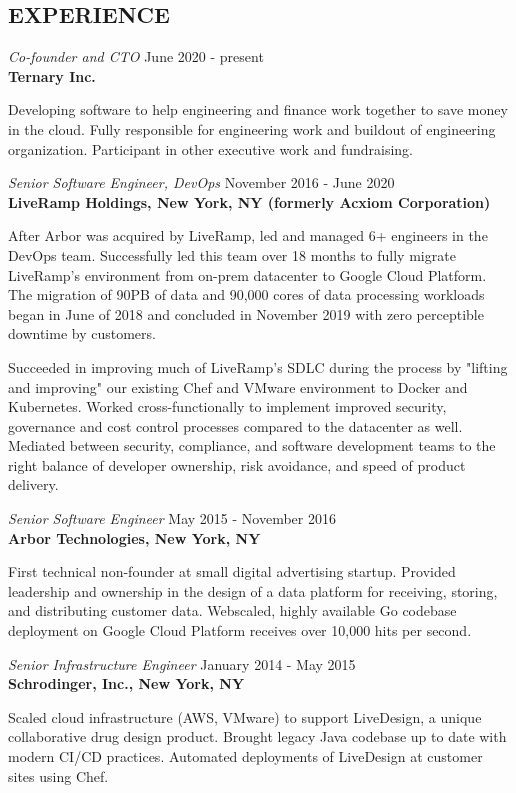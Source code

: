 \documentclass[overlapped,line,margin]{res}
\begin{document}
\begin{resume}
\section{EXPERIENCE}
\textit{Co-founder and CTO} \hfill June 2020 - present \\
\textbf{Ternary Inc.}

  Developing software to help engineering and finance work together to
  save money in the cloud. Fully responsible for engineering work and
  buildout of engineering organization. Participant in other executive
  work and fundraising.

\textit{Senior Software Engineer, DevOps} \hfill November 2016 - June 2020 \\
\textbf{LiveRamp Holdings, New York, NY (formerly Acxiom Corporation)}

  After Arbor was acquired by LiveRamp, led and managed 6+ engineers in
  the DevOps team. Successfully led this team over 18 months to fully
  migrate LiveRamp's environment from on-prem datacenter to Google Cloud
  Platform. The migration of 90PB of data and 90,000 cores of data
  processing workloads began in June of 2018 and concluded in November
  2019 with zero perceptible downtime by customers.

  Succeeded in improving much of LiveRamp's SDLC during the process by
  "lifting and improving" our existing Chef and VMware environment to
  Docker and Kubernetes. Worked cross-functionally to implement improved
  security, governance and cost control processes compared to the
  datacenter as well. Mediated between security, compliance, and
  software development teams to the right balance of developer
  ownership, risk avoidance, and speed of product delivery.

\textit{Senior Software Engineer} \hfill May 2015 - November 2016 \\
\textbf{Arbor Technologies, New York, NY}

  First technical non-founder at small digital advertising startup.
  Provided leadership and ownership in the design of a data platform for
  receiving, storing, and distributing customer data. Webscaled, highly
  available Go codebase deployment on Google Cloud Platform receives
  over 10,000 hits per second.

\textit{Senior Infrastructure Engineer} \hfill January 2014 - May 2015 \\
\textbf{Schrodinger, Inc., New York, NY}

  Scaled cloud infrastructure (AWS, VMware) to support LiveDesign, a
  unique collaborative drug design product. Brought legacy Java codebase
  up to date with modern CI/CD practices. Automated deployments of
  LiveDesign at customer sites using Chef.


\end{resume}
\end{document}
